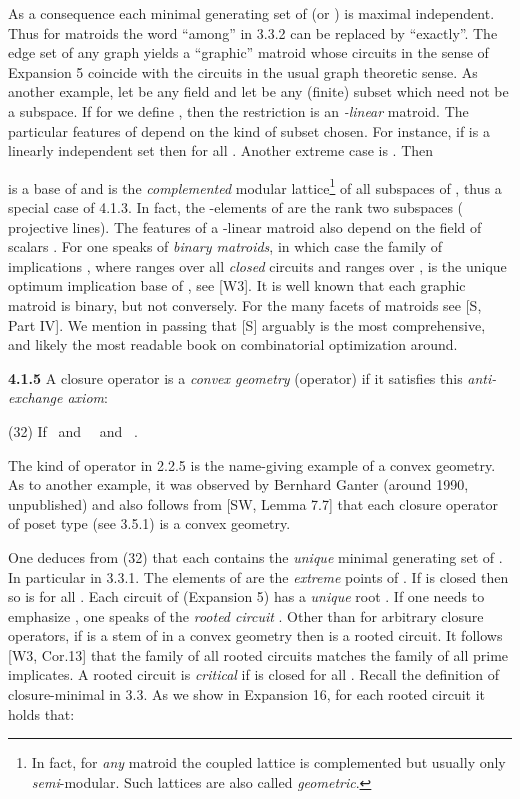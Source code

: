 \documentclass[11pt]{article}
\begin{document}
As a consequence each minimal generating set of  (or ) is maximal independent. Thus for matroids the word ``among'' in 3.3.2 can be replaced by ``exactly''. The edge set  of any graph yields a ``graphic'' matroid  whose circuits in the sense of Expansion 5 coincide with the circuits in the usual graph theoretic sense. As another example, let  be any field and let  be any (finite) subset which need not be a subspace. If for  we define , then the restriction  is an {\it -linear} matroid.  The particular features of   depend on the kind of subset  chosen. For instance, if  is a linearly independent set then  for all . Another extreme case is . Then

is a base of  and  is the {\it complemented} modular lattice\footnote{In fact, for {\it any} matroid  the coupled lattice is complemented but usually only {\it semi}-modular. Such lattices are also called {\it geometric}.} of all subspaces of , thus a special case of 4.1.3. In fact, the -elements of  are the rank two subspaces ( projective lines). The features of  a -linear matroid also depend on the field of scalars . For  one speaks of {\it binary matroids}, in which case the family  of implications , where  ranges over all {\it closed} circuits  and  ranges over , is the unique optimum implication base of , see [W3]. It is well known that each graphic matroid is binary, but not conversely. For the many facets of matroids see [S, Part IV]. We mention in passing that [S] arguably is the most comprehensive, and likely the most readable book on combinatorial optimization around.

{\bf 4.1.5} A closure operator  is a {\it convex geometry} (operator) if it satisfies this {\it anti-exchange axiom}:

(32) \quad If  \ and \  \ and \ .

The kind of operator  in 2.2.5 is the name-giving example of a convex geometry. 
As to another example, it was observed by Bernhard Ganter (around 1990, unpublished) and also follows from [SW, Lemma 7.7] that each closure operator  of poset type (see 3.5.1) is a convex geometry. 

One deduces from (32) that each  contains the {\it unique} minimal generating set  of . In particular  in 3.3.1.  The elements of  are the {\it extreme} points of . If  is closed then so is  for all .
Each circuit  of  (Expansion 5) has a {\it unique} root . If one needs to emphasize , one speaks of the {\it rooted circuit} . Other than for arbitrary closure operators, if  is a stem of  in a convex geometry then  is a rooted circuit. It follows [W3, Cor.13] that the family of all rooted circuits matches the family  of all prime implicates. A rooted circuit  is {\it critical} if  is closed for all . Recall the definition of closure-minimal in 3.3. As we show in Expansion 16, for each rooted circuit  it holds that:
\end{document}
